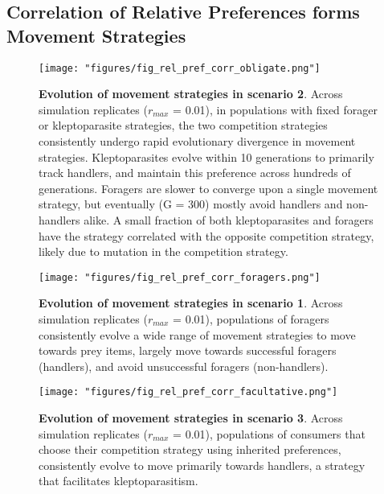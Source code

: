 \documentclass[]{article}
\begin{document}
\newpage

\hypertarget{correlation-of-relative-preferences-forms-movement-strategies}{%
\subsection{Correlation of Relative Preferences forms Movement Strategies}\label{correlation-of-relative-preferences-forms-movement-strategies}}

\begin{figure}
\centering
\texttt{[image: "figures/fig\_rel\_pref\_corr\_obligate.png"]}
\caption{\textbf{Evolution of movement strategies in scenario 2}. Across simulation replicates (\(r_{max}\) = 0.01), in populations with fixed forager or kleptoparasite strategies, the two competition strategies consistently undergo rapid evolutionary divergence in movement strategies. Kleptoparasites evolve within 10 generations to primarily track handlers, and maintain this preference across hundreds of generations. Foragers are slower to converge upon a single movement strategy, but eventually (G = 300) mostly avoid handlers and non-handlers alike. A small fraction of both kleptoparasites and foragers have the strategy correlated with the opposite competition strategy, likely due to mutation in the competition strategy.}
\end{figure}

\begin{figure}
\centering
\texttt{[image: "figures/fig\_rel\_pref\_corr\_foragers.png"]}
\caption{\textbf{Evolution of movement strategies in scenario 1}. Across simulation replicates (\(r_{max}\) = 0.01), populations of foragers consistently evolve a wide range of movement strategies to move towards prey items, largely move towards successful foragers (handlers), and avoid unsuccessful foragers (non-handlers).}
\end{figure}

\begin{figure}
\centering
\texttt{[image: "figures/fig\_rel\_pref\_corr\_facultative.png"]}
\caption{\textbf{Evolution of movement strategies in scenario 3}. Across simulation replicates (\(r_{max}\) = 0.01), populations of consumers that choose their competition strategy using inherited preferences, consistently evolve to move primarily towards handlers, a strategy that facilitates kleptoparasitism.}
\end{figure}
\end{document}
